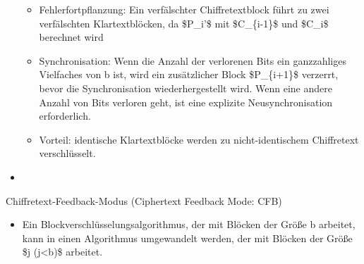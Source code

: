 \documentclass[a4paper]{article}
\begin{document}
\begin{multicols}{3}
\begin{itemize}
              \begin{itemize}
                  \item
                        Fehlerfortpflanzung: Ein verfälschter Chiffretextblock führt zu zwei
                        verfälschten Klartextblöcken, da \$P\_i'\$ mit \$C\_\{i-1\}\$ und
                        \$C\_i\$ berechnet wird
                  \item
                        Synchronisation: Wenn die Anzahl der verlorenen Bits ein
                        ganzzahliges Vielfaches von b ist, wird ein zusätzlicher Block
                        \$P\_\{i+1\}\$ verzerrt, bevor die Synchronisation wiederhergestellt
                        wird. Wenn eine andere Anzahl von Bits verloren geht, ist eine
                        explizite Neusynchronisation erforderlich.
                  \item
                        Vorteil: identische Klartextblöcke werden zu nicht-identischem
                        Chiffretext verschlüsselt.
              \end{itemize}
        \item
    \end{itemize}

    Chiffretext-Feedback-Modus (Ciphertext Feedback Mode: CFB)

    \begin{itemize}
        \item
              Ein Blockverschlüsselungsalgorithmus, der mit Blöcken der Größe b
              arbeitet, kann in einen Algorithmus umgewandelt werden, der mit
              Blöcken der Größe \$j (j\textless b)\$ arbeitet.


\end{itemize}
\end{multicols}
\end{document}
